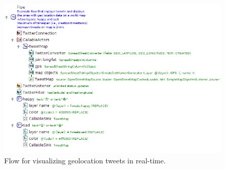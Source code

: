 \documentclass[a4paper,10pt]{book}
\begin{document}
\begin{figure}[htb]
  \centering
  \includegraphics[width=12.0cm]{images/visualize_tweets-realtime-flow.png}
  \caption{Flow for visualizing geolocation tweets in real-time.}
  \label{visualize_tweets-realtime-flow}
\end{figure}
\end{document}
